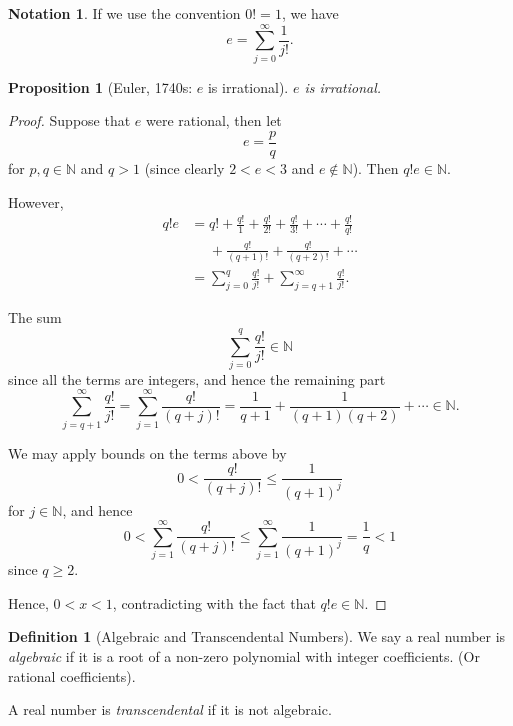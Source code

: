 \documentclass{article}
\newtheorem{proposition}[theorem]{Proposition}
\theoremstyle{definition}
\newtheorem{definition}[theorem]{Definition}
\newtheorem{notation}[theorem]{Notation}
\theoremstyle{remark}
\newcommand{\pqty}[1]{\left(#1\right)}
\newcommand{\NN}{\mathbb{N}}
\begin{document}
\begin{notation}
    If we use the convention \(0! = 1\), we have
    \[
        e = \sum_{j = 0}^{\infty} \frac{1}{j!}.
    \]
\end{notation}

\begin{proposition}[Euler, 1740s: \(e\) is irrational]
    \(e\) is irrational.
\end{proposition}

\begin{proof}
    Suppose that \(e\) were rational, then let
    \[
        e = \frac{p}{q}
    \]
    for \(p, q \in \NN\) and \(q > 1\) (since clearly \(2 < e < 3\) and \(e \notin \NN\)). Then \(q! e \in \NN\).

    However,
    \begin{align*}
        q!e &= q! + \frac{q!}{1} + \frac{q!}{2!} + \frac{q!}{3!} + \cdots + \frac{q!}{q!} \\
        &\phantom{=} + \frac{q!}{\pqty{q + 1}!} + \frac{q!}{\pqty{q + 2}!} + \cdots \\
        &= \sum_{j = 0}^{q} \frac{q!}{j!} + \sum_{j = q + 1}^{\infty} \frac{q!}{j!}.
    \end{align*}

    The sum
    \[
        \sum_{j = 0}^{q} \frac{q!}{j!} \in \NN
    \]
    since all the terms are integers, and hence the remaining part
    \[
        \sum_{j = q + 1}^{\infty} \frac{q!}{j!} = \sum_{j = 1}^{\infty} \frac{q!}{\pqty{q + j}!} = \frac{1}{q + 1} + \frac{1}{\pqty{q + 1} \pqty{q + 2}} + \cdots \in \NN.
    \]

    We may apply bounds on the terms above by
    \[
        0 < \frac{q!}{\pqty{q + j}!} \leq \frac{1}{\pqty{q + 1}^j}
    \]
    for \(j \in \NN\), and hence
    \[
        0 < \sum_{j = 1}^{\infty} \frac{q!}{\pqty{q + j}!} \leq \sum_{j = 1}^{\infty} \frac{1}{\pqty{q + 1}^j} = \frac{1}{q} < 1
    \]
    since \(q \geq 2\).

    Hence, \(0 < x < 1\), contradicting with the fact that \(q! e \in \NN\).
\end{proof}

\begin{definition}[Algebraic and Transcendental Numbers]
    We say a real number is \emph{algebraic} if it is a root of a non-zero polynomial with integer coefficients. (Or rational coefficients).

    A real number is \emph{transcendental} if it is not algebraic.
\end{definition}
\end{document}
